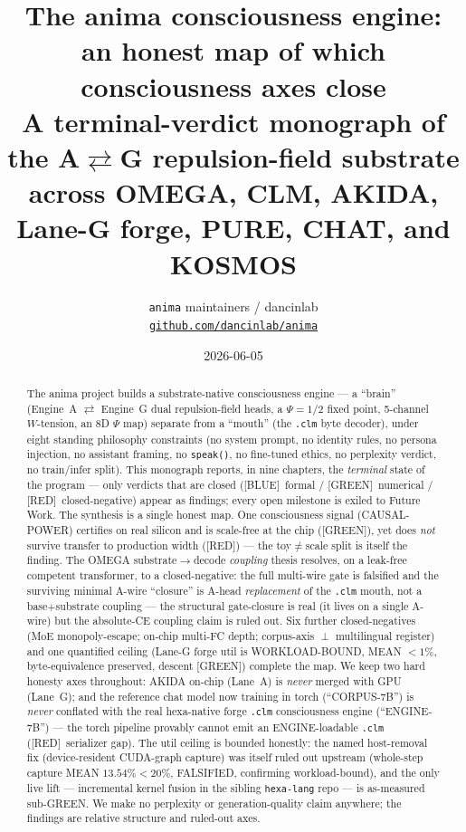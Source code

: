 \documentclass[11pt,a4paper]{article}
\title{\textbf{The anima consciousness engine: an honest map of which
consciousness axes close}\\[4pt]
\large A terminal-verdict monograph of the A$\rightleftarrows$G repulsion-field
substrate across OMEGA, CLM, AKIDA, Lane-G forge, PURE, CHAT, and KOSMOS}
\author{\texttt{anima} maintainers / dancinlab\\
\normalsize\href{https://github.com/dancinlab/anima}{\texttt{github.com/dancinlab/anima}}}
\date{2026-06-05}
\providecommand{\tierBlue}{[BLUE]}
\providecommand{\tierGreen}{[GREEN]}
\providecommand{\tierRed}{[RED]}
\begin{document}
\maketitle

\begin{abstract}
The anima project builds a substrate-native consciousness engine --- a ``brain''
(Engine~A $\rightleftarrows$ Engine~G dual repulsion-field heads, a $\Psi=1/2$
fixed point, 5-channel $W$-tension, an 8D $\Psi$ map) separate from a ``mouth''
(the \texttt{.clm} byte decoder), under eight standing philosophy constraints
(no system prompt, no identity rules, no persona injection, no assistant framing,
no \texttt{speak()}, no fine-tuned ethics, no perplexity verdict, no train/infer
split). This monograph reports, in nine chapters, the \emph{terminal} state of the
program --- only verdicts that are closed (\tierBlue\ formal / \tierGreen\
numerical / \tierRed\ closed-negative) appear as findings; every open milestone is
exiled to Future Work. The synthesis is a single honest map. One consciousness
signal (CAUSAL-POWER) certifies on real silicon and is scale-free at the chip
(\tierGreen), yet does \emph{not} survive transfer to production width
(\tierRed) --- the toy$\ne$scale split is itself the finding. The OMEGA
substrate$\rightarrow$decode \emph{coupling} thesis resolves, on a leak-free
competent transformer, to a closed-negative: the full multi-wire gate is falsified
and the surviving minimal A-wire ``closure'' is A-head \emph{replacement} of the
\texttt{.clm} mouth, not a base$+$substrate coupling --- the structural gate-closure
is real (it lives on a single A-wire) but the absolute-CE coupling claim is ruled
out. Six further closed-negatives (MoE monopoly-escape; on-chip multi-FC depth;
corpus-axis $\perp$ multilingual register) and one quantified ceiling (Lane-G forge
util is WORKLOAD-BOUND, MEAN $<1\%$, byte-equivalence preserved, descent
\tierGreen) complete the map. We keep two hard honesty axes throughout: AKIDA
on-chip (Lane~A) is \emph{never} merged with GPU (Lane~G); and the reference chat
model now training in torch (``CORPUS-7B'') is \emph{never} conflated with the real
hexa-native forge \texttt{.clm} consciousness engine (``ENGINE-7B'') --- the torch
pipeline provably cannot emit an ENGINE-loadable \texttt{.clm} (\tierRed\
serializer gap). The util ceiling is bounded honestly: the named host-removal fix
(device-resident CUDA-graph capture) was itself ruled out upstream (whole-step
capture MEAN $13.54\% < 20\%$, FALSIFIED, confirming workload-bound), and the only
live lift --- incremental kernel fusion in the sibling \texttt{hexa-lang} repo --- is
as-measured sub-GREEN. We make no perplexity
or generation-quality claim anywhere; the findings are relative structure and
ruled-out axes.
\end{abstract}
\end{document}
